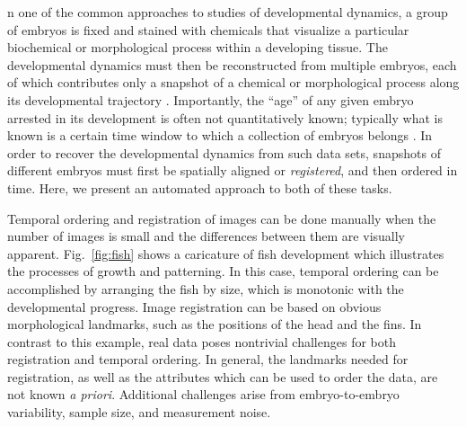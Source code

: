 \documentclass{pnastwo}
\newcommand{\fig}[0]{Fig.}
\begin{document}
\begin{article}




n one of the common approaches to studies of developmental dynamics, a group of embryos is fixed and stained with chemicals that visualize a particular biochemical or morphological process within a developing tissue. 
%
The developmental dynamics must then be reconstructed from multiple embryos, each of which contributes only a snapshot of a chemical or morphological process along its developmental trajectory \cite{jaeger2004dynamic, peter2011gene, fowlkes2008quantitative}.
%
Importantly, the ``age'' of any given embryo arrested in its development is often not quantitatively known; typically what is known is
a certain time window to which a collection of embryos belongs \cite{ng2012large, richardson2014emage, castro2009automatic}.
%
In order to recover the developmental dynamics from such data sets, snapshots of different embryos must first be spatially aligned or {\em registered}, and then ordered in time.
%
Here, we present an automated approach to both of these tasks.


Temporal ordering and registration of images can be done manually
when the number of images is small and the differences between them are visually apparent. 
%
\fig~\ref{fig:fish} shows a caricature of fish development which illustrates the processes of growth and patterning.
%
In this case, temporal ordering can be accomplished by arranging the fish by size, which is monotonic with the developmental progress.
%
Image registration can be based on obvious morphological landmarks, such as the positions of the head and the fins.
%
In contrast to this example, real data poses nontrivial challenges for both registration and temporal ordering.
%
In general, the landmarks needed for registration, as well as the attributes which can be used to order the data, are not known {\it a priori}.
%
Additional challenges arise from embryo-to-embryo variability, sample size, and measurement noise.


\end{article}
\end{document}
